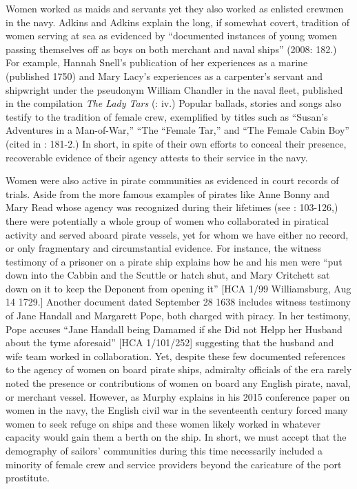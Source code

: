   Women worked as maids and servants yet they also worked as enlisted crewmen in the navy. Adkins and Adkins explain the long, if somewhat covert, tradition of women serving at sea as evidenced by “documented instances of young women passing themselves off as boys on both merchant and naval ships” (2008: 182.) For example, Hannah Snell’s publication of her experiences as a marine (published 1750) and Mary Lacy’s experiences as a carpenter’s servant and shipwright under the pseudonym William Chandler in the naval fleet, published in the compilation \textit{The Lady Tars} (\citealt{SnellEtAl2008}: iv.) Popular ballads, stories and songs also testify to the tradition of female crew, exemplified by titles such as “Susan’s Adventures in a Man-of-War,” “The “Female Tar,” and “The Female Cabin Boy” (cited in \citealt{AdkinsAdkins2008}: 181-2.) In short, in spite of their own efforts to conceal their presence, recoverable evidence of their agency attests to their service in the navy. 

Women were also active in pirate communities as evidenced in court records of trials. Aside from the more famous examples of pirates like Anne Bonny and Mary Read whose agency was recognized during their lifetimes (see \citealt{Rediker2004}: 103-126,) there were potentially a whole group of women who collaborated in piratical activity and served aboard pirate vessels, yet for whom we have either no record, or only fragmentary and circumstantial evidence. For instance, the witness testimony of a prisoner on a pirate ship explains how he and his men were “put down into the Cabbin and the Scuttle or hatch shut, and Mary Critchett sat down on it to keep the Deponent from opening it” [HCA 1/99 Williamsburg, Aug 14 1729.] Another document dated September 28 1638 includes witness testimony of Jane Handall and Margarett Pope, both charged with piracy. In her testimony, Pope accuses “Jane Handall being Damamed if she Did not Helpp her Husband about the tyme aforesaid” [HCA 1/101/252] suggesting that the husband and wife team worked in collaboration. Yet, despite these few documented references to the agency of women on board pirate ships, admiralty officials of the era rarely noted the presence or contributions of women on board any English pirate, naval, or merchant vessel. However, as Murphy explains in his 2015 conference paper on women in the navy, the English civil war in the seventeenth century forced many women to seek refuge on ships and these women likely worked in whatever capacity would gain them a berth on the ship. In short, we must accept that the demography of sailors’ communities during this time necessarily included a minority of female crew and service providers beyond the caricature of the port prostitute. 

